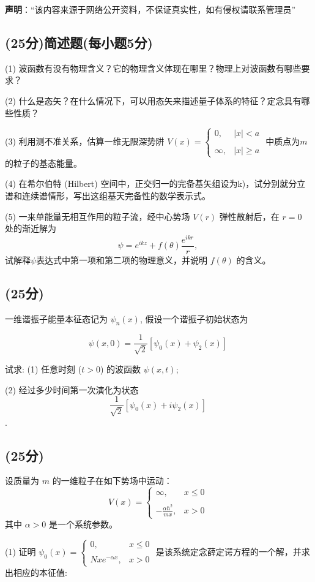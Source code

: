 
\textbf{声明}：“该内容来源于网络公开资料，不保证真实性，如有侵权请联系管理员”

\subsection{(25分)简述题(每小题5分)}

(1) 波函数有没有物理含义？它的物理含义体现在哪里？物理上对波函数有哪些要求？

(2) 什么是态矢？在什么情况下，可以用态矢来描述量子体系的特征？定念具有哪些性质？

(3) 利用测不准关系，估算一维无限深势阱 $V(x) = \begin{cases} 
0, & |x| < a \\\\
\infty, & |x| \geq a
\end{cases}$ 中质点为$m$的粒子的基态能量。

(4) 在希尔伯特 (Hilbert) 空间中，正交归一的完备基矢组设为{k)}，试分别就分立谱和连续谱情形，写出这组基天完备性的数学表示式。

(5) 一来单能量无相互作用的粒子流，经中心势场 $V(r)$ 弹性散射后，在 $r=0$ 处的渐近解为
$$ \psi = e^{ikz} + f(\theta) \frac{e^{ikr}}{r},~$$
试解释$\psi$表达式中第一项和第二项的物理意义，并说明 $f(\theta)$ 的含义。
\subsection{(25分)}
一维谐振子能量本征态记为 $\psi_n(x)$, 假设一个谐振子初始状态为

$$\psi(x,0) = \frac{1}{\sqrt{2}} \left[ \psi_0(x) + \psi_2(x) \right]~$$

试求: (1) 任意时刻  ($t > 0$)  的波函数 $\psi(x,t)$; 

(2) 经过多少时间第一次演化为状态  $$\frac{1}{\sqrt{2}} \left[ \psi_0(x) + i \psi_2(x) \right]~$$.
\subsection{(25分)}
设质量为 $m$ 的一维粒子在如下势场中运动：
\[V(x) =\begin{cases}     \infty, & x \leq 0 \\\\    -\frac{\alpha \hbar^2}{mx}, & x > 0\end{cases}~\]
其中 $\alpha > 0$ 是一个系统参数。

(1) 证明 $\psi_0(x) = 
\begin{cases}
    0, & x \leq 0 \\\\
    N xe^{-\alpha x}, & x > 0
\end{cases}
$ 
是该系统定念薛定谔方程的一个解，并求出相应的本征值:

